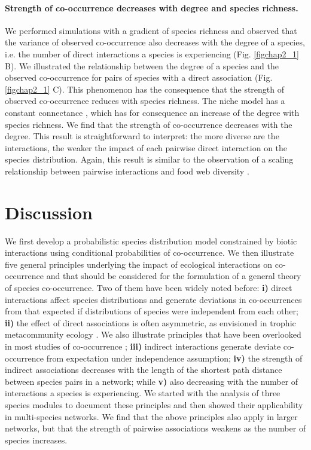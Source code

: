 \paragraph*{Strength of co-occurrence decreases with degree and species
richness.} We performed simulations with a gradient of species richness and
observed that the variance of observed co-occurrence also decreases with the
degree of a species, i.e. the number of direct interactions a species is experiencing
(Fig. \ref{figchap2_1} B). We illustrated the relationship between the
degree of a species and the observed co-occurrence for pairs of species with a
direct association (Fig. \ref{figchap2_1} C). This phenomenon has the consequence that the
strength of observed co-occurrence reduces with species richness. The niche
model has a constant connectance \citep{Williams2000}, which has for consequence an increase of the degree with species richness. We find that the strength of co-occurrence
decreases with the degree. This result is straightforward to interpret: the
more diverse are the interactions, the weaker the impact of each
pairwise direct interaction on the species distribution. Again, this result is
similar to the observation of a scaling relationship between pairwise
interactions and food web diversity \citep{Berlow2009}.

\section*{Discussion}
\label{discussion}

%
We first develop a probabilistic species distribution model constrained by
biotic interactions using conditional probabilities of co-occurrence. We then illustrate five general principles underlying the impact of ecological interactions on co-occurrence and that should be considered for the formulation of a general theory of species co-occurrence. Two of them have been widely noted before: \textbf{i)} direct interactions affect species distributions and generate deviations in co-occurrences from that expected if distributions of species were independent from each other; \textbf{ii)} the effect of direct associations is often asymmetric, as envisioned in trophic metacommunity ecology \citep{Holt2009}. We also illustrate principles that have been overlooked in most studies of co-occurrence \citep{Araujo2011}; \textbf{iii)} indirect interactions generate deviate co-occurrence from expectation under independence assumption; \textbf{iv)} the strength of indirect associations decreases with the length of the shortest path distance between species pairs in a network; while \textbf{v)} also decreasing with the number of interactions a species is experiencing. We started with the analysis of three species modules to document these principles and then showed their applicability in multi-species networks. We find that the above principles also apply in larger networks, but that the strength of pairwise associations weakens as the number of species increases.

